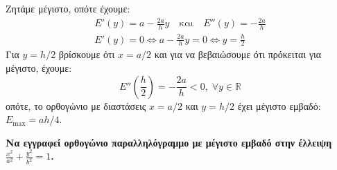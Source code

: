 \documentclass[a4paper,table]{report}
\begin{document}
\begin{solution}
Ζητάμε μέγιστο, οπότε έχουμε:
\begin{gather*}
  E'(y) = a - \frac{2a}{h} y \quad \text{και} \quad E''(y) = - \frac{2a}{h} \\
  E'(y)=0 \Leftrightarrow a - \frac{2a}{h} y = 0 \Leftrightarrow y= \frac{h}{2}
\end{gather*}
Για $ y=h/2 $ βρίσκουμε ότι $ x=a/2 $ και για να βεβαιώσουμε ότι πρόκειται για 
μέγιστο, έχουμε:
\[
  E''\left(\frac{h}{2}\right) = - \frac{2a}{h} < 0, \; \forall y \in \mathbb{R}
\] 
οπότε, το ορθογώνιο με διαστάσεις $ x=a/2 $ και $ y=h/2 $ έχει μέγιστο εμβαδό: 
$ E_{\max} = {ah}/{4}  $.
\end{solution}

\begin{mybox3}
\begin{problem}
  {\bfseries \boldmath Να εγγραφεί ορθογώνιο παραλληλόγραμμο με μέγιστο εμβαδό στην
    έλλειψη $ \frac{x^{2}}{a^{2}} + \frac{y^{2}}{b^{2}} = 1 $.}
\end{problem}
\end{mybox3}
\end{document}
